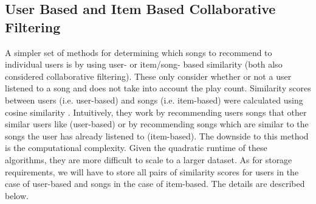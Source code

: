 \documentclass[12pt,preprint]{aastex}
\begin{document}
%


\subsection{User Based and Item Based Collaborative Filtering}
A simpler set of methods for determining which songs to recommend to individual users is by using user- or item/song- based similarity (both also considered collaborative filtering). These only consider whether or not a user listened to a song and does not take into account the play count. Similarity scores between users (i.e. user-based) and songs (i.e. item-based) were calculated using cosine similarity \citep{aiolli2013preliminary, li2012million}. Intuitively, they work by recommending users songs that other similar users like (user-based) or by recommending songs which are similar to the songs the user has already listened to (item-based). The downside to this method is the computational complexity. Given the quadratic runtime of these algorithms, they are more difficult to scale to a larger dataset. As for storage requirements, we will have to store all pairs of similarity scores for users in the case of user-based and songs in the case of item-based. The details are described below.
\end{document}

